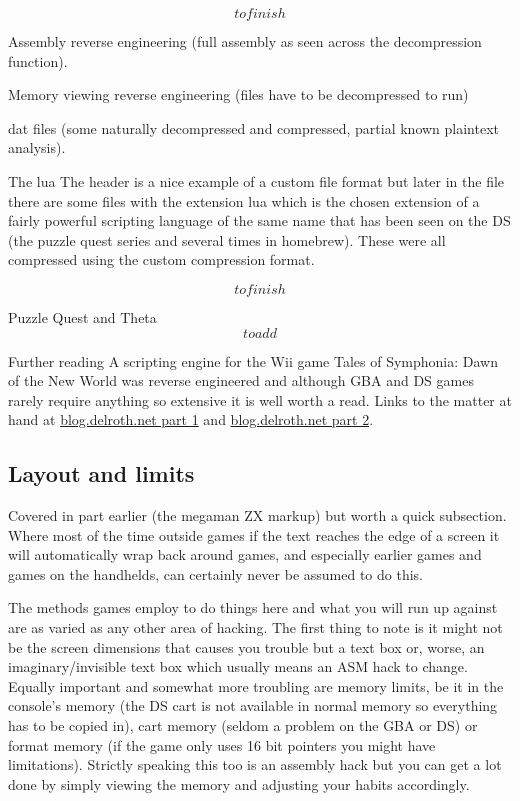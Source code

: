 \documentclass[
]{book}
\begin{document}
\[to finish\]

Assembly reverse engineering (full assembly as seen across the decompression function).

Memory viewing reverse engineering (files have to be decompressed to run)

dat files (some naturally decompressed and compressed, partial known plaintext analysis).

The lua The header is a nice example of a custom file format but later in the file there are some files with the extension lua which is the chosen extension of a fairly powerful scripting language of the same name that has been seen on the DS (the puzzle quest series and several times in homebrew). These were all compressed using the custom compression format.

\[to finish\]

Puzzle Quest and Theta \[to add\]

Further reading A scripting engine for the Wii game Tales of Symphonia: Dawn of the New World was reverse engineered and although GBA and DS games rarely require anything so extensive it is well worth a read. Links to the matter at hand at \href{http://blog.delroth.net/2011/06/reverse-engineering-a-wii-game-script-interpreter-part-1/}{blog.delroth.net part 1} and \href{http://blog.delroth.net/2011/06/reverse-engineering-a-wii-game-script-interpreter-part-2/}{blog.delroth.net part 2}.

\hypertarget{layout-and-limits}{%
\subsection{Layout and limits}\label{layout-and-limits}}

Covered in part earlier (the megaman ZX markup) but worth a quick subsection. Where most of the time outside games if the text reaches the edge of a screen it will automatically wrap back around games, and especially earlier games and games on the handhelds, can certainly never be assumed to do this.

The methods games employ to do things here and what you will run up against are as varied as any other area of hacking. The first thing to note is it might not be the screen dimensions that causes you trouble but a text box or, worse, an imaginary/invisible text box which usually means an ASM hack to change. Equally important and somewhat more troubling are memory limits, be it in the console's memory (the DS cart is not available in normal memory so everything has to be copied in), cart memory (seldom a problem on the GBA or DS) or format memory (if the game only uses 16 bit pointers you might have limitations). Strictly speaking this too is an assembly hack but you can get a lot done by simply viewing the memory and adjusting your habits accordingly.
\end{document}

